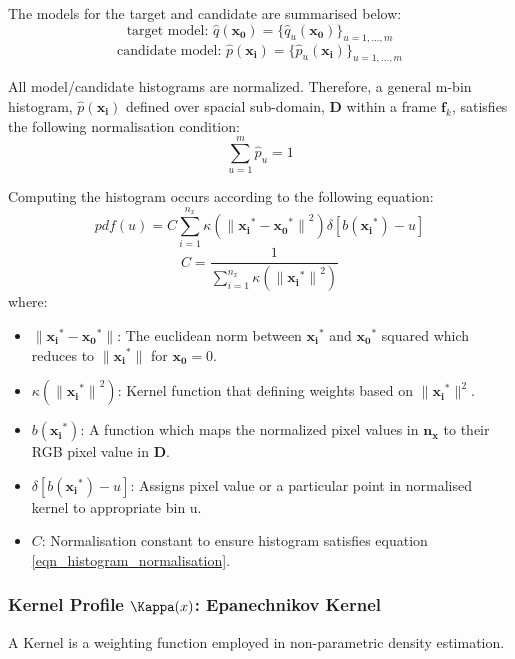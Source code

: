 The models for the target and candidate are summarised below:
$$\text{target model: } \hat{q}(\mathbf{x_0})=\{\hat{q}_u(\mathbf{x_0})\}_{u=1,...,m}$$
$$\text{candidate model: } \hat{p}(\mathbf{x_i})=\{\hat{p}_u(\mathbf{x_i})\}_{u=1,...,m}$$

All model/candidate histograms are normalized. Therefore, a general m-bin
histogram, $\hat{p}(\mathbf{x_i})$ defined over spacial sub-domain, $\mathbf{D}$
within a frame $\mathbf{f}_k$, satisfies the following normalisation condition:
\begin{equation}\label{eqn_histogram_normalisation}
    \sum_{u=1}^{m}\hat{p}_u = 1
\end{equation}

Computing the histogram occurs according to the following equation:
\begin{equation}
    pdf(u)=C\sum_{i=1}^{n_x}\kappa({\parallel{\mathbf{x_i}^*}-{\mathbf{x_0}^*}\parallel}^2)\delta[b(\mathbf{x_i}^*)-u]    
\end{equation}
\begin{equation}
    C=\frac{1}{\sum_{i=1}^{n_x}\kappa({\parallel\mathbf{x_i}^*\parallel}^2)}
\end{equation}
where:
\begin{itemize}
    \item $\parallel{\mathbf{x_i}}^*-{\mathbf{x_0}}^*\parallel$: The euclidean
        norm between $\mathbf{x_i}^*$ and ${\mathbf{x_0}}^*$ squared which
        reduces to $\parallel{\mathbf{x_i}}^*\parallel$ for $\mathbf{x_0} = 0$. 
    \item $\kappa({\parallel{\mathbf{x_i}}^*\parallel}^2)$: Kernel function that
        defining weights based on $\parallel{\mathbf{x_i}}^*\parallel^2$.
    \item $b({\mathbf{x_i}}^*)$: A function which maps the normalized pixel
        values in $\mathbf{n_x}$ to their RGB pixel value in $\mathbf{D}$.
    \item $\delta[b({\mathbf{x_i}}^*)-u]$: Assigns pixel value or a particular
        point in normalised kernel to appropriate bin u.
    \item $C$: Normalisation constant to ensure histogram satisfies equation
        \ref{eqn_histogram_normalisation}.
\end{itemize}

\subsubsection{Kernel Profile $\Kappa(x)$: Epanechnikov Kernel}
A Kernel is a weighting function employed in non-parametric density estimation. 

